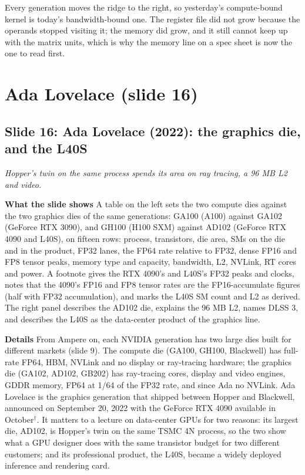 \documentclass[11pt,letterpaper]{article}
\newcommand{\setstage}[1]{\colorlet{stagec}{#1}}
\newcommand{\slide}[3]{%
  \subsection[Slide #1: #2]{Slide #1: #2}%
  {\color{muted}\itshape #3\par}\medskip}
\newcommand{\para}[1]{\medskip\noindent\textbf{#1}\quad}
\newenvironment{intuition}{\begin{tcolorbox}[intuitionbox]}{\end{tcolorbox}}
\begin{document}
\begin{intuition}
Every generation moves the ridge to the right, so yesterday's compute-bound kernel is today's bandwidth-bound one. The register file did not grow because the operands stopped visiting it; the memory did grow, and it still cannot keep up with the matrix units, which is why the memory line on a spec sheet is now the one to read first.
\end{intuition}

\setstage{mlp}
\section{Ada Lovelace (slide 16)}

\slide{16}{Ada Lovelace (2022): the graphics die, and the L40S}{Hopper's twin on the same process spends its area on ray tracing, a 96 MB L2 and video.}

\para{What the slide shows} A table on the left sets the two compute dies against the two graphics dies of the same generations: GA100 (A100) against GA102 (GeForce RTX 3090), and GH100 (H100 SXM) against AD102 (GeForce RTX 4090 and L40S), on fifteen rows: process, transistors, die area, SMs on the die and in the product, FP32 lanes, the FP64 rate relative to FP32, dense FP16 and FP8 tensor peaks, memory type and capacity, bandwidth, L2, NVLink, RT cores and power. A footnote gives the RTX 4090's and L40S's FP32 peaks and clocks, notes that the 4090's FP16 and FP8 tensor rates are the FP16-accumulate figures (half with FP32 accumulation), and marks the L40S SM count and L2 as derived. The right panel describes the AD102 die, explains the 96 MB L2, names DLSS 3, and describes the L40S as the data-center product of the graphics line.

\para{Details} From Ampere on, each NVIDIA generation has two large dies built for different markets (slide 9). The compute die (GA100, GH100, Blackwell) has full-rate FP64, HBM, NVLink and no display or ray-tracing hardware; the graphics die (GA102, AD102, GB202) has ray-tracing cores, display and video engines, GDDR memory, FP64 at 1/64 of the FP32 rate, and since Ada no NVLink. Ada Lovelace is the graphics generation that shipped between Hopper and Blackwell, announced on September 20, 2022 with the GeForce RTX 4090 available in October$^\dagger$. It matters to a lecture on data-center GPUs for two reasons: its largest die, AD102, is Hopper's twin on the same TSMC 4N process, so the two show what a GPU designer does with the same transistor budget for two different customers; and its professional product, the L40S, became a widely deployed inference and rendering card.
\end{document}
